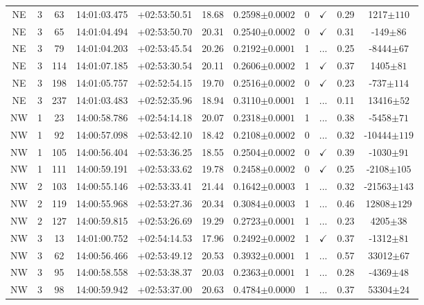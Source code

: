 \begin{landscape}
\begin{longtable}{ccccccccccc}
	NE & 3 & 63 & 14:01:03.475 & +02:53:50.51 & 18.68 & 0.2598$\pm{0.0002}$ & 0 & $\checkmark$ & 0.29 & 1217$\pm{110}$ \\
	NE & 3 & 65 & 14:01:04.494 & +02:53:50.70 & 20.31 & 0.2540$\pm{0.0002}$ & 0 & $\checkmark$ & 0.31 & -149$\pm{86}$ \\
	NE & 3 & 79 & 14:01:04.203 & +02:53:45.54 & 20.26 & 0.2192$\pm{0.0001}$ & 1 & ... & 0.25 & -8444$\pm{67}$ \\
	NE & 3 & 114 & 14:01:07.185 & +02:53:30.54 & 20.11 & 0.2606$\pm{0.0002}$ & 1 & $\checkmark$ & 0.37 & 1405$\pm{81}$ \\
	NE & 3 & 198 & 14:01:05.757 & +02:52:54.15 & 19.70 & 0.2516$\pm{0.0002}$ & 0 & $\checkmark$ & 0.23 & -737$\pm{114}$ \\
	NE & 3 & 237 & 14:01:03.483 & +02:52:35.96 & 18.94 & 0.3110$\pm{0.0001}$ & 1 & ... & 0.11 & 13416$\pm{52}$ \\
	NW & 1 & 23 & 14:00:58.786 & +02:54:14.18 & 20.07 & 0.2318$\pm{0.0001}$ & 1 & ... & 0.38 & -5458$\pm{71}$ \\
	NW & 1 & 92 & 14:00:57.098 & +02:53:42.10 & 18.42 & 0.2108$\pm{0.0002}$ & 0 & ... & 0.32 & -10444$\pm{119}$ \\
	NW & 1 & 105 & 14:00:56.404 & +02:53:36.25 & 18.55 & 0.2504$\pm{0.0002}$ & 0 & $\checkmark$ & 0.39 & -1030$\pm{91}$ \\
	NW & 1 & 111 & 14:00:59.191 & +02:53:33.62 & 19.78 & 0.2458$\pm{0.0002}$ & 0 & $\checkmark$ & 0.25 & -2108$\pm{105}$ \\
	NW & 2 & 103 & 14:00:55.146 & +02:53:33.41 & 21.44 & 0.1642$\pm{0.0003}$ & 1 & ... & 0.32 & -21563$\pm{143}$ \\
	NW & 2 & 119 & 14:00:55.968 & +02:53:27.36 & 20.34 & 0.3084$\pm{0.0003}$ & 1 & ... & 0.46 & 12808$\pm{129}$ \\
	NW & 2 & 127 & 14:00:59.815 & +02:53:26.69 & 19.29 & 0.2723$\pm{0.0001}$ & 1 & ... & 0.23 & 4205$\pm{38}$ \\
	NW & 3 & 13 & 14:01:00.752 & +02:54:14.53 & 17.96 & 0.2492$\pm{0.0002}$ & 1 & $\checkmark$ & 0.37 & -1312$\pm{81}$ \\
	NW & 3 & 62 & 14:00:56.466 & +02:53:49.12 & 20.53 & 0.3932$\pm{0.0001}$ & 1 & ... & 0.57 & 33012$\pm{67}$ \\
	NW & 3 & 95 & 14:00:58.558 & +02:53:38.37 & 20.03 & 0.2363$\pm{0.0001}$ & 1 & ... & 0.28 & -4369$\pm{48}$ \\
	NW & 3 & 98 & 14:00:59.942 & +02:53:37.00 & 20.63 & 0.4784$\pm{0.0000}$ & 1 & ... & 0.37 & 53304$\pm{24}$ \\

\end{longtable}
\end{landscape}
